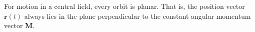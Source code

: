 For motion in a central field, every orbit is planar. That is, the position vector $\mathbf{r}(t)$ always lies in the plane perpendicular to the constant angular momentum vector $\mathbf{M}$.
